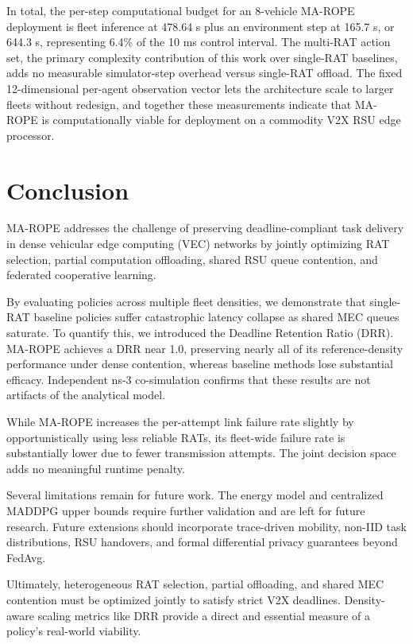 \documentclass[journal,10pt,twocolumn]{IEEEtran}
\begin{document}
In total, the per-step computational budget for an 8-vehicle MA-ROPE deployment is fleet inference at 478.64 \textmu s plus an environment step at 165.7 \textmu s, or 644.3 \textmu s, representing 6.4\% of the 10 ms control interval. The multi-RAT action set, the primary complexity contribution of this work over single-RAT baselines, adds no measurable simulator-step overhead versus single-RAT offload. The fixed 12-dimensional per-agent observation vector lets the architecture scale to larger fleets without redesign, and together these measurements indicate that MA-ROPE is computationally viable for deployment on a commodity V2X RSU edge processor.



\section{Conclusion}

MA-ROPE addresses the challenge of preserving deadline-compliant task delivery in dense vehicular edge computing (VEC) networks by jointly optimizing RAT selection, partial computation offloading, shared RSU queue contention, and federated cooperative learning. 

By evaluating policies across multiple fleet densities, we demonstrate that single-RAT baseline policies suffer catastrophic latency collapse as shared MEC queues saturate. To quantify this, we introduced the Deadline Retention Ratio (DRR). MA-ROPE achieves a DRR near 1.0, preserving nearly all of its reference-density performance under dense contention, whereas baseline methods lose substantial efficacy. Independent ns-3 co-simulation confirms that these results are not artifacts of the analytical model.

While MA-ROPE increases the per-attempt link failure rate slightly by opportunistically using less reliable RATs, its fleet-wide failure rate is substantially lower due to fewer transmission attempts. The joint decision space adds no meaningful runtime penalty.

Several limitations remain for future work. The energy model and centralized MADDPG upper bounds require further validation and are left for future research. Future extensions should incorporate trace-driven mobility, non-IID task distributions, RSU handovers, and formal differential privacy guarantees beyond FedAvg.

Ultimately, heterogeneous RAT selection, partial offloading, and shared MEC contention must be optimized jointly to satisfy strict V2X deadlines. Density-aware scaling metrics like DRR provide a direct and essential measure of a policy's real-world viability.




\end{document}
